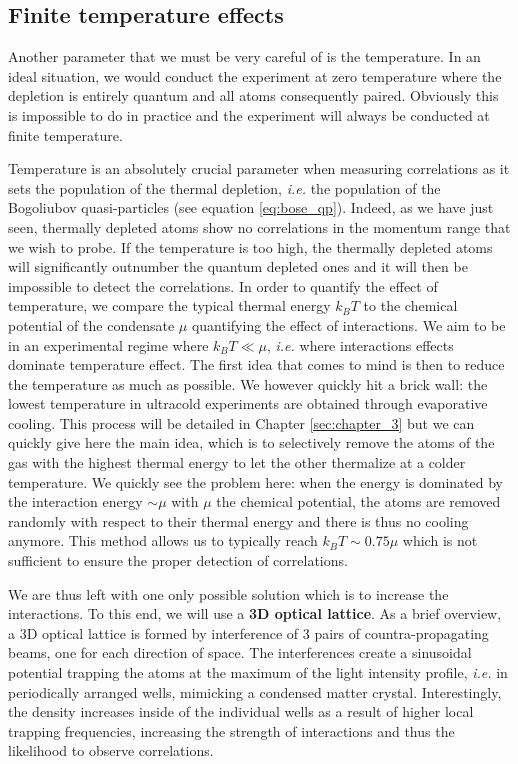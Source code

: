 \subsection{Finite temperature effects}

\label{sec:ch1_temperature}

Another parameter that we must be very careful of is the temperature. In an ideal situation, we would conduct the experiment at zero temperature where the depletion is entirely quantum and all atoms consequently \kmk paired. Obviously this is impossible to do in practice and the experiment will always be conducted at finite temperature.

Temperature is an absolutely crucial parameter when measuring \kmk correlations as it sets the population of the thermal depletion, {\it i.e.} the population of the Bogoliubov quasi-particles (see equation \ref{eq:bose_qp}). Indeed, as we have just seen, thermally depleted atoms show no \kmk correlations in the momentum range that we wish to probe. If the temperature is too high, the thermally depleted atoms will significantly outnumber the quantum depleted ones and it will then be impossible to detect the \kmk correlations. In order to quantify the effect of temperature, we compare the typical thermal energy $k_B T$ to the chemical potential of the condensate $\mu$ quantifying the effect of interactions. We aim to be in an experimental regime where $k_B T \ll \mu$, {\it i.e.} where interactions effects dominate temperature effect. The first idea that comes to mind is then to reduce the temperature as much as possible. We however quickly hit a brick wall: the lowest temperature in ultracold experiments are obtained through evaporative cooling. This process will be detailed in Chapter \ref{sec:chapter_3} but we can quickly give here the main idea, which is to selectively remove the atoms of the gas with the highest thermal energy to let the other thermalize at a colder temperature. We quickly see the problem here: when the energy is dominated by the interaction energy $\sim \mu$ with $\mu$ the chemical potential, the atoms are removed randomly with respect to their thermal energy and there is thus no cooling anymore. This method allows us to typically reach $k_B T \sim 0.75 \mu$ \cite{chang2016} which is not sufficient to ensure the proper detection of \kmk correlations.

We are thus left with one only possible solution which is to increase the interactions. To this end, we will use a \textbf{3D optical lattice}. As a brief overview, a 3D optical lattice is formed by interference of 3 pairs of countra-propagating beams, one for each direction of space. The interferences create a sinusoidal potential trapping the atoms at the maximum of the light intensity profile, {\it i.e.} in periodically arranged wells, mimicking a condensed matter crystal. Interestingly, the density increases inside of the individual wells as a result of higher local trapping frequencies, increasing the strength of interactions and thus the likelihood to observe \kmk correlations.



